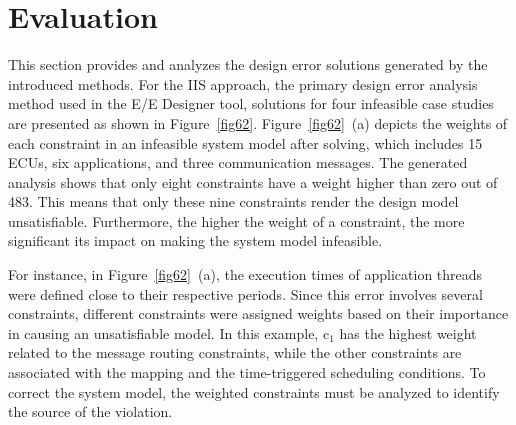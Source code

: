     \section{Evaluation}
    
    
    This section provides and analyzes the design error solutions generated by the introduced methods. For the IIS approach, the primary design error analysis method used in the E/E Designer tool, solutions for four infeasible case studies are presented as shown in Figure~\ref{fig62}. Figure~\ref{fig62}~(a) depicts the weights of each constraint in an infeasible system model after solving, which includes 15 ECUs, six applications, and three communication messages. The generated analysis shows that only eight constraints have a weight higher than zero out of 483. This means that only these nine constraints render the design model unsatisfiable. Furthermore, the higher the weight of a constraint, the more significant its impact on making the system model infeasible.

     
    
    For instance, in Figure~\ref{fig62}~(a), the execution times of application threads were defined close to their respective periods. Since this error involves several constraints, different constraints were assigned weights based on their importance in causing an unsatisfiable model. In this example, c$_1$ has the highest weight related to the message routing constraints, while the other constraints are associated with the mapping and the time-triggered scheduling conditions. To correct the system model, the weighted constraints must be analyzed to identify the source of the violation.

